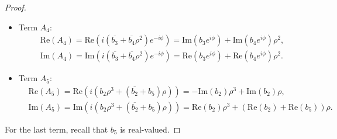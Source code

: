 \documentclass[10pt]{article}
\theoremstyle{definition}
\theoremstyle{definition}
\numberwithin{equation}{section}
\newcommand{\im}[1]{\mathrm{Im} \left(#1\right)}
\newcommand{\re}[1]{\mathrm{Re}\left(#1\right)}
\begin{document}
\begin{proof}
\begin{itemize}
        \item Term $A_4$:
        \begin{equation*}
        \begin{aligned}
        &\re{A_4} = \re{i (\overline{b_3} + \overline{b_4} \rho^2) e^{-i\phi}} = \im{b_3 e^{i\phi}} + \im{b_4 e^{i\phi}} \rho^2,\\[5pt]
        &\im{A_4} = \im{i (\overline{b_3} + \overline{b_4} \rho^2) e^{-i\phi}} = \re{b_3 e^{i\phi}} + \re{b_4 e^{i\phi}} \rho^2 .
        \end{aligned}
        \end{equation*}
    
        \item Term $A_5$:
        \begin{equation*}
        \begin{aligned}
        &\re{A_5} = \re{i \left( b_2 \rho^3 + (\overline{b_2} + b_5) \rho \right)} = -\im{b_2} \rho^3 + \im{b_2} \rho,\\[5pt]
        &\im{A_5} = \im{i \left( b_2 \rho^3 + (\overline{b_2} + b_5) \rho \right)} = \re{b_2} \rho^3 +  (\re{b_2} + \re{b_5}) \rho .
        \end{aligned}
        \end{equation*}
    \end{itemize}
    For the last term, recall that $b_5$ is real-valued.
    

\end{proof}
\end{document}

